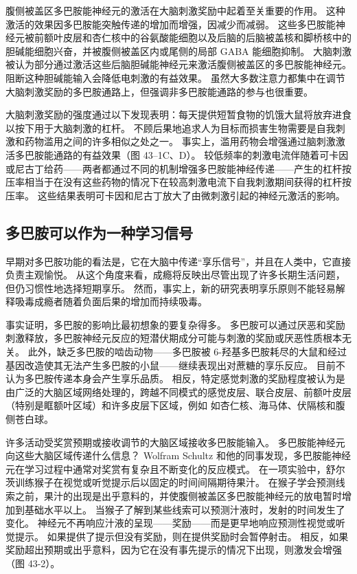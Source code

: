 腹侧被盖区多巴胺能神经元的激活在大脑刺激奖励中起着至关重要的作用。 这种激活的效果因多巴胺能突触传递的增加而增强，因减少而减弱。 这些多巴胺能神经元被前额叶皮层和杏仁核中的谷氨酸能细胞以及后脑的后脑被盖核和脚桥核中的胆碱能细胞兴奋，并被腹侧被盖区内或尾侧的局部 GABA 能细胞抑制。 大脑刺激被认为部分通过激活这些后脑胆碱能神经元来激活腹侧被盖区的多巴胺能神经元。 阻断这种胆碱能输入会降低电刺激的有益效果。 虽然大多数注意力都集中在调节大脑刺激奖励的多巴胺通路上，但强调非多巴胺能通路的参与也很重要。

大脑刺激奖励的强度通过以下发现表明：每天提供短暂食物的饥饿大鼠将放弃进食以按下用于大脑刺激的杠杆。 不顾后果地追求人为目标而损害生物需要是自我刺激和药物滥用之间的许多相似之处之一。 事实上，滥用药物会增强通过脑刺激激活多巴胺能通路的有益效果（图 43–1C、D）。 较低频率的刺激电流伴随着可卡因或尼古丁给药——两者都通过不同的机制增强多巴胺能神经传递——产生的杠杆按压率相当于在没有这些药物的情况下在较高刺激电流下自我刺激期间获得的杠杆按压率。 这些结果表明可卡因和尼古丁放大了由微刺激引起的神经元激活的影响。

\subsection{多巴胺可以作为一种学习信号}
早期对多巴胺功能的看法是，它在大脑中传递“享乐信号”，并且在人类中，它直接负责主观愉悦。 从这个角度来看，成瘾将反映出尽管出现了许多长期生活问题，但仍习惯性地选择短期享乐。 然而，事实上，新的研究表明享乐原则不能轻易解释吸毒成瘾者随着负面后果的增加而持续吸毒。

事实证明，多巴胺的影响比最初想象的要复杂得多。 多巴胺可以通过厌恶和奖励刺激释放，多巴胺神经元反应的短潜伏期成分可能与刺激的奖励或厌恶性质根本无关。 此外，缺乏多巴胺的啮齿动物——多巴胺被 6-羟基多巴胺耗尽的大鼠和经过基因改造使其无法产生多巴胺的小鼠——继续表现出对蔗糖的享乐反应。 目前不认为多巴胺传递本身会产生享乐品质。 相反，特定感觉刺激的奖励程度被认为是由广泛的大脑区域网络处理的，跨越不同模式的感觉皮层、联合皮层、前额叶皮层（特别是眶额叶区域）和许多皮层下区域，例如 如杏仁核、海马体、伏隔核和腹侧苍白球。

许多活动受奖赏预期或接收调节的大脑区域接收多巴胺能输入。 多巴胺能神经元向这些大脑区域传递什么信息？ Wolfram Schultz 和他的同事发现，多巴胺能神经元在学习过程中通常对奖赏有复杂且不断变化的反应模式。 在一项实验中，舒尔茨训练猴子在视觉或听觉提示后以固定的时间间隔期待果汁。 在猴子学会预测线索之前，果汁的出现是出乎意料的，并使腹侧被盖区多巴胺能神经元的放电暂时增加到基础水平以上。 当猴子了解到某些线索可以预测汁液时，发射的时间发生了变化。 神经元不再响应汁液的呈现——奖励——而是更早地响应预测性视觉或听觉提示。 如果提供了提示但没有奖励，则在提供奖励时会暂停射击。 相反，如果奖励超出预期或出乎意料，因为它在没有事先提示的情况下出现，则激发会增强（图 43-2）。

